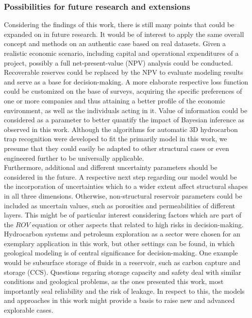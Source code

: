 	\subsubsection{Possibilities for future research and extensions}	
	Considering the findings of this work, there is still many points that could be expanded on in future research. It would be of interest to apply the same overall concept and methods on an authentic case based on real datasets. Given a realistic economic scenario, including capital and operational expenditures of a project, possibly a full net-present-value (NPV) analysis could be conducted. Recoverable reserves could be replaced by the NPV to evaluate modeling results and serve as a base for decision-making. A more elaborate respective loss function could be customized on the base of surveys, acquiring the specific preferences of one or more companies and thus attaining a better profile of the economic environment, as well as the individuals acting in it. Value of information could be considered as a parameter to better quantify the impact of Bayesian inference as observed in this work.
	Although the algorithms for automatic 3D hydrocarbon trap recognition were developed to fit the primarily model in this work, we presume that they could easily be adapted to other structural cases or even engineered further to be universally applicable.\\
	Furthermore, additional and different uncertainty parameters should be considered in the future. A respective next step regarding our model would be the incorporation of uncertainties which to a wider extent affect structural shapes in all three dimensions. Otherwise, non-structural reservoir parameters could be included as uncertain values, such as porosities and permeabilities of different layers. This might be of particular interest considering factors which are part of the $ROV$ equation or other aspects that related to high risks in decision-making.\\
	Hydrocarbon systems and petroleum exploration as a sector were chosen for an exemplary application in this work, but other settings can be found, in which geological modeling is of central significance for decision-making. One example would be subsurface storage of fluids in a reservoir, such as carbon capture and storage (CCS). Questions regaring storage capacity and safety deal with similar conditions and geological problems, as the ones presented this work, most importantly seal reliability and the risk of leakage. In respect to this, the models and approaches in this work might provide a basis to raise new and advanced explorable cases.